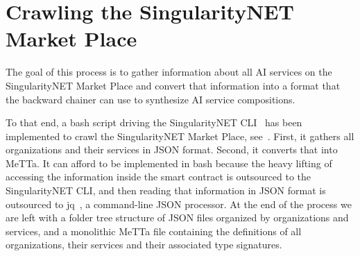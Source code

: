 \documentclass[]{report}
\begin{document}
\section{Crawling the SingularityNET Market Place}
\label{sec:csnmp}
The goal of this process is to gather information about all AI
services on the SingularityNET Market Place and convert that
information into a format that the backward chainer can use to
synthesize AI service compositions.

To that end, a bash script driving the SingularityNET
CLI~\cite{SNETCLI} has been implemented to crawl the SingularityNET
Market Place, see~\cite{TODO}.  First, it gathers all organizations
and their services in JSON format.  Second, it converts that into
MeTTa.  It can afford to be implemented in bash because the heavy
lifting of accessing the information inside the smart contract is
outsourced to the SingularityNET CLI, and then reading that
information in JSON format is outsourced to jq~\cite{JQ}, a
command-line JSON processor.  At the end of the process we are left
with a folder tree structure of JSON files organized by organizations
and services, and a monolithic MeTTa file containing the definitions
of all organizations, their services and their associated type
signatures.
\end{document}

